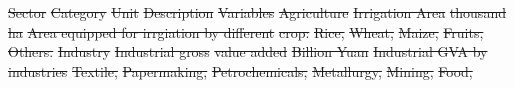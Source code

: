 \documentclass[default, sn-standardnature]{sn-jnl} %
\providecommand{\DIFdeltex}[1]{{\protect\color{red}\sout{#1}}}                      %
\providecommand{\DIFdelFL}[1]{\DIFdel{#1}} %
\providecommand{\DIFdelbeginFL}{} %
\providecommand{\DIFdel}[1]{\texorpdfstring{\DIFdeltex{#1}}{}} %
\newcommand{\DIFscaledelfig}{0.5}
\newlength{\DIFdelgraphicswidth} %
\newlength{\DIFdelgraphicsheight} %
\newcommand{\DIFdelincludegraphics}[2][]{%
\sbox{\DIFdelgraphicsbox}{\DIFOincludegraphics[#1]{#2}}%
\settoboxwidth{\DIFdelgraphicswidth}{\DIFdelgraphicsbox} %
\settoboxtotalheight{\DIFdelgraphicsheight}{\DIFdelgraphicsbox} %
\scalebox{\DIFscaledelfig}{%
\parbox[b]{\DIFdelgraphicswidth}{\usebox{\DIFdelgraphicsbox}\\[-\baselineskip] \rule{\DIFdelgraphicswidth}{0em}}\llap{\resizebox{\DIFdelgraphicswidth}{\DIFdelgraphicsheight}{%
\setlength{\unitlength}{\DIFdelgraphicswidth}%
\begin{picture}(1,1)%
\thicklines\linethickness{2pt} %
{\color[rgb]{1,0,0}\put(0,0){\framebox(1,1){}}}%
{\color[rgb]{1,0,0}\put(0,0){\line( 1,1){1}}}%
{\color[rgb]{1,0,0}\put(0,1){\line(1,-1){1}}}%
\end{picture}%
}\hspace*{3pt}}} %
} %
\DeclareRobustCommand{\DIFdelbeginFL}{\DIFOdelbeginFL \let\includegraphics\DIFdelincludegraphics} %
\begin{document}
\begin{table}[!ht]
	\caption{Variables and their categories for water use predictions}
	\scriptsize
	\label{tab:variables}
	\DIFdelbeginFL %
\DIFdelFL{Sector }%
\DIFdelFL{Category }%
\DIFdelFL{Unit }%
\DIFdelFL{Description }%
\DIFdelFL{Variables }%
\DIFdelFL{Agriculture }%
\DIFdelFL{Irrigation Area }%
\DIFdelFL{thousand ha }%
\DIFdelFL{Area equipped for irrgiation by different }%
\DIFdelFL{crop:}%
\DIFdelFL{Rice, }%
\DIFdelFL{Wheat, }%
\DIFdelFL{Maize, }%
\DIFdelFL{Fruits, }%
\DIFdelFL{Others.}%
\DIFdelFL{Industry }%
\DIFdelFL{Industrial gross }%
\DIFdelFL{value added}%
\DIFdelFL{Billion Yuan }%
\DIFdelFL{Industrial GVA by industries }%
\DIFdelFL{Textile, }%
\DIFdelFL{Papermaking, }%
\DIFdelFL{Petrochemicals, }%
\DIFdelFL{Metallurgy, }%
\DIFdelFL{Mining, }%
\DIFdelFL{Food, }%

\end{table}
\end{document}
